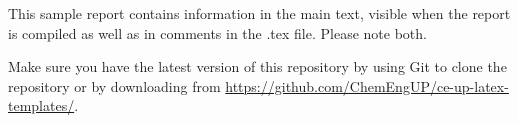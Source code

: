 This sample report contains information in the main text, visible when the report is compiled as well as in comments in the .tex file. Please note both.

Make sure you have the latest version of this repository by using Git to clone the repository or by downloading from \url{https://github.com/ChemEngUP/ce-up-latex-templates/}.
